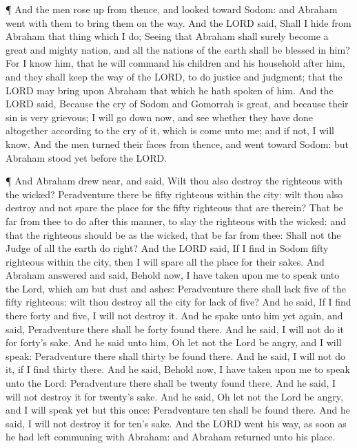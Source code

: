  ¶ And the men rose up from thence, and looked toward
Sodom: and Abraham went with them to bring them on the way.
 And the LORD said, Shall I hide from Abraham that thing
which I do;  Seeing that Abraham shall surely become a
great and mighty nation, and all the nations of the earth shall be
blessed in him?  For I know him, that he will command his
children and his household after him, and they shall keep the way of the
LORD, to do justice and judgment; that the LORD may bring upon Abraham
that which he hath spoken of him.  And the LORD said,
Because the cry of Sodom and Gomorrah is great, and because their sin is
very grievous;  I will go down now, and see whether they
have done altogether according to the cry of it, which is come unto me;
and if not, I will know.  And the men turned their faces
from thence, and went toward Sodom: but Abraham stood yet before the
LORD.

 ¶ And Abraham drew near, and said, Wilt thou also destroy
the righteous with the wicked?  Peradventure there be fifty
righteous within the city: wilt thou also destroy and not spare the
place for the fifty righteous that are therein?  That be
far from thee to do after this manner, to slay the righteous with the
wicked: and that the righteous should be as the wicked, that be far from
thee: Shall not the Judge of all the earth do right?  And
the LORD said, If I find in Sodom fifty righteous within the city, then
I will spare all the place for their sakes.  And Abraham
answered and said, Behold now, I have taken upon me to speak unto the
Lord, which am but dust and ashes:  Peradventure there
shall lack five of the fifty righteous: wilt thou destroy all the city
for lack of five? And he said, If I find there forty and five, I will
not destroy it.  And he spake unto him yet again, and said,
Peradventure there shall be forty found there. And he said, I will not
do it for forty's sake.  And he said unto him, Oh let not
the Lord be angry, and I will speak: Peradventure there shall thirty be
found there. And he said, I will not do it, if I find thirty there.
 And he said, Behold now, I have taken upon me to speak
unto the Lord: Peradventure there shall be twenty found there. And he
said, I will not destroy it for twenty's sake.  And he
said, Oh let not the Lord be angry, and I will speak yet but this once:
Peradventure ten shall be found there. And he said, I will not destroy
it for ten's sake.  And the LORD went his way, as soon as
he had left communing with Abraham: and Abraham returned unto his place.

